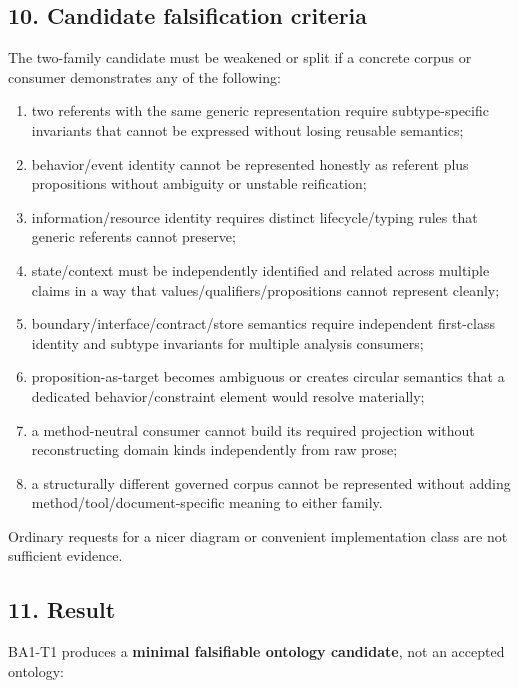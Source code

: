 \documentclass[
]{article}
\providecommand{\tightlist}{%
  \setlength{\itemsep}{0pt}\setlength{\parskip}{0pt}}
\begin{document}
\subsection{10. Candidate falsification
criteria}\label{10-candidate-falsification-criteria}

The two-family candidate must be weakened or split if a concrete corpus
or consumer demonstrates any of the following:

\begin{enumerate}
\def\labelenumi{\arabic{enumi}.}
\tightlist
\item
  two referents with the same generic representation require
  subtype-specific invariants that cannot be expressed without losing
  reusable semantics;
\item
  behavior/event identity cannot be represented honestly as referent
  plus propositions without ambiguity or unstable reification;
\item
  information/resource identity requires distinct lifecycle/typing rules
  that generic referents cannot preserve;
\item
  state/context must be independently identified and related across
  multiple claims in a way that values/qualifiers/propositions cannot
  represent cleanly;
\item
  boundary/interface/contract/store semantics require independent
  first-class identity and subtype invariants for multiple analysis
  consumers;
\item
  proposition-as-target becomes ambiguous or creates circular semantics
  that a dedicated behavior/constraint element would resolve materially;
\item
  a method-neutral consumer cannot build its required projection without
  reconstructing domain kinds independently from raw prose;
\item
  a structurally different governed corpus cannot be represented without
  adding method/tool/document-specific meaning to either family.
\end{enumerate}

Ordinary requests for a nicer diagram or convenient implementation class
are not sufficient evidence.

\subsection{11. Result}\label{11-result}

BA1-T1 produces a \textbf{minimal falsifiable ontology candidate}, not
an accepted ontology:
\end{document}
